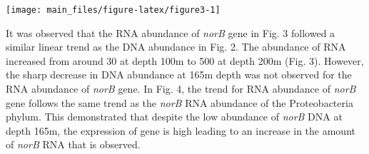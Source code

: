 \documentclass[11 pt,]{article}
\newenvironment{Shaded}{\begin{snugshade}}{\end{snugshade}}
\newcommand{\KeywordTok}[1]{\textcolor[rgb]{0.13,0.29,0.53}{\textbf{#1}}}
\newcommand{\DataTypeTok}[1]{\textcolor[rgb]{0.13,0.29,0.53}{#1}}
\newcommand{\DecValTok}[1]{\textcolor[rgb]{0.00,0.00,0.81}{#1}}
\newcommand{\StringTok}[1]{\textcolor[rgb]{0.31,0.60,0.02}{#1}}
\newcommand{\CommentTok}[1]{\textcolor[rgb]{0.56,0.35,0.01}{\textit{#1}}}
\newcommand{\OtherTok}[1]{\textcolor[rgb]{0.56,0.35,0.01}{#1}}
\newcommand{\OperatorTok}[1]{\textcolor[rgb]{0.81,0.36,0.00}{\textbf{#1}}}
\newcommand{\NormalTok}[1]{#1}
\begin{document}
\begin{Shaded}
\end{Shaded}

\begin{center}\texttt{[image: main\_files/figure-latex/figure3-1]} \end{center}

It was observed that the RNA abundance of \emph{norB} gene in Fig. 3
followed a similar linear trend as the DNA abundance in Fig. 2. The
abundance of RNA increased from around 30 at depth 100m to 500 at depth
200m (Fig. 3). However, the sharp decrease in DNA abundance at 165m
depth was not observed for the RNA abundance of \emph{norB} gene. In
Fig. 4, the trend for RNA abundance of \emph{norB} gene follows the same
trend as the \emph{norB} RNA abundance of the Proteobacteria phylum.
This demonstrated that despite the low abundance of \emph{norB} DNA at
depth 165m, the expression of gene is high leading to an increase in the
amount of \emph{norB} RNA that is observed.
\end{document}
